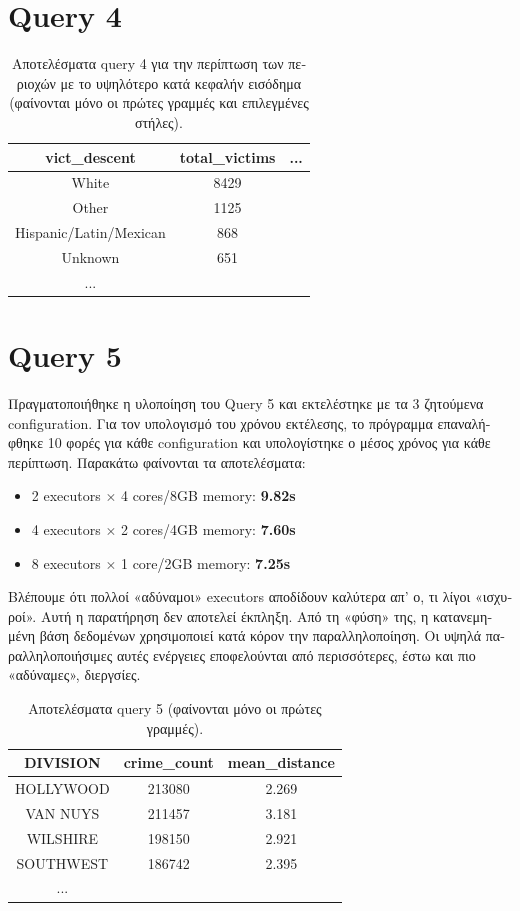 \documentclass[a4paper,12pt]{article}
\begin{document}
\begin{otherlanguage}{greek}
\section*{Query 4}
	\FloatBarrier
	\lipsum[4] %
	\begin{table}[h]
		\centering
		\begin{tabular}{ccc}
			vict\_descent & total\_victims & ... \\
			\hline
			White & 8429 & \\
			Other & 1125 & \\
			Hispanic/Latin/Mexican & 868 & \\
			Unknown & 651 & \\
			...
		\end{tabular}
		\caption{Aποτελέσματα query 4 για την περίπτωση των
		περιοχών με το υψηλότερο κατά κεφαλήν εισόδημα 
		(φαίνονται μόνο οι 
		πρώτες γραμμές και επιλεγμένες στήλες).}
	\end{table}
	\FloatBarrier

\section*{Query 5}
	\FloatBarrier
	\par Πραγματοποιήθηκε η υλοποίηση του Query 5 και εκτελέστηκε με τα 3
	ζητούμενα configuration. Για τον υπολογισμό του χρόνου εκτέλεσης, το πρόγραμμα
	επαναλήφθηκε 10 φορές για κάθε configuration και υπολογίστηκε ο μέσος χρόνος για
	κάθε περίπτωση. Παρακάτω φαίνονται τα αποτελέσματα:
	\begin{itemize}
		\item 2 executors $\times$ 4 cores/8GB memory: \textbf{9.82s}
		\item 4 executors $\times$ 2 cores/4GB memory: \textbf{7.60s}
		\item 8 executors $\times$ 1 core/2GB memory: \textbf{7.25s}
	\end{itemize}
	\par Βλέπουμε ότι πολλοί «αδύναμοι» executors αποδίδουν καλύτερα απ' ο, τι λίγοι
	«ισχυροί». Αυτή η παρατήρηση δεν αποτελεί έκπληξη. Από τη «φύση» της, η
	κατανεμημένη βάση δεδομένων χρησιμοποιεί κατά κόρον την παραλληλοποίηση. Οι
	υψηλά παραλληλοποιήσιμες αυτές ενέργειες εποφελούνται από περισσότερες, έστω
	και πιο «αδύναμες», διεργσίες.
	\begin{table}[h]
		\centering
		\begin{tabular}{ccc}
			DIVISION & crime\_count & mean\_distance \\
			\hline
			HOLLYWOOD & 213080 & 2.269 \\
			VAN NUYS & 211457 & 3.181 \\
			WILSHIRE & 198150 & 2.921 \\
			SOUTHWEST & 186742 & 2.395 \\
			...
		\end{tabular}
		\caption{Aποτελέσματα query 5 (φαίνονται μόνο οι 
		πρώτες γραμμές).}
	\end{table}
	\FloatBarrier

\FloatBarrier
\printbibliography

\end{otherlanguage}
\end{document}
